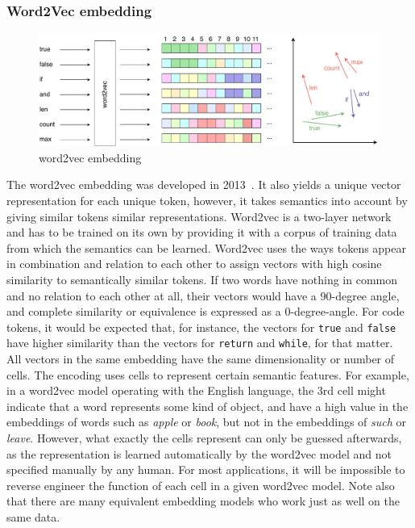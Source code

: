 \documentclass[
a4paper,
pagesize,
pdftex,
12pt,
twoside, %
BCOR=5mm, %
ngerman,
fleqn,
final,
]{scrartcl}
\begin{document}
	\subsubsection{Word2Vec embedding}\label{word2vec}
	\begin{figure}[ht]
		\centering
		\includegraphics[width=\linewidth]{img/word2vecEmbedding}
		\caption{word2vec embedding}
		\label{fig:word2vecEmbedding}
	\end{figure}
	The word2vec embedding was developed in 2013~\cite{Mikolov.2013}. It also yields a unique vector representation for each unique token, however, it takes semantics into account by giving similar tokens similar representations. Word2vec is a two-layer network and has to be trained on its own by providing it with a corpus of training data from which the semantics can be learned. Word2vec uses the ways tokens appear in combination and relation to each other to assign vectors with high cosine similarity to semantically similar tokens. If two words have nothing in common and no relation to each other at all, their vectors would have a 90-degree angle, and complete similarity or equivalence is expressed as a 0-degree-angle. For code tokens, it would be expected that, for instance, the vectors for \texttt{true} and \texttt{false} have higher similarity than the vectors for \texttt{return} and \texttt{while}, for that matter.\\
	All vectors in the same embedding have the same dimensionality or number of cells. The encoding uses cells to represent certain semantic features. For example, in a word2vec model operating with the English language, the 3rd cell might indicate that a word represents some kind of object, and have a high value in the embeddings of words such as \textit{apple} or \textit{book}, but not in the embeddings of \textit{such} or \textit{leave}. However, what exactly the cells represent can only be guessed afterwards, as the representation is learned automatically by the word2vec model and not specified manually by any human. For most applications, it will be impossible to reverse engineer the function of each cell in a given word2vec model. Note also that there are many equivalent embedding models who work just as well on the same data.\\ 
\end{document}

